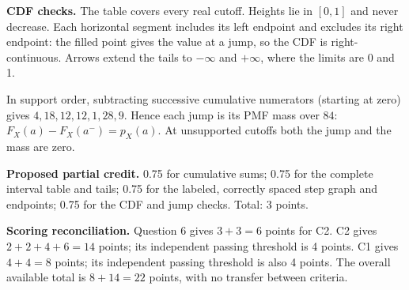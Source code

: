 \begin{center}\end{center}

\textbf{CDF checks.} The table covers every real cutoff. Heights lie in $[0,1]$ and never decrease. Each horizontal segment includes its left endpoint and excludes its right endpoint: the filled point gives the value at a jump, so the CDF is right-continuous. Arrows extend the tails to $-\infty$ and $+\infty$, where the limits are 0 and 1.

In support order, subtracting successive cumulative numerators (starting at zero) gives $4,18,12,12,1,28,9$. Hence each jump is its PMF mass over $84$: $F_X(a)-F_X(a^-)=p_X(a)$. At unsupported cutoffs both the jump and the mass are zero.

\textbf{Proposed partial credit.} 0.75 for cumulative sums; 0.75 for the complete interval table and tails; 0.75 for the labeled, correctly spaced step graph and endpoints; 0.75 for the CDF and jump checks. Total: 3 points.

\par\vspace{3mm}\secInicio[][sec:q6]

\textbf{Scoring reconciliation.} Question 6 gives $3+3=6$ points for C2. C2 gives $2+2+4+6=14$ points; its independent passing threshold is 4 points. C1 gives $4+4=8$ points; its independent passing threshold is also 4 points. The overall available total is $8+14=22$ points, with no transfer between criteria.


